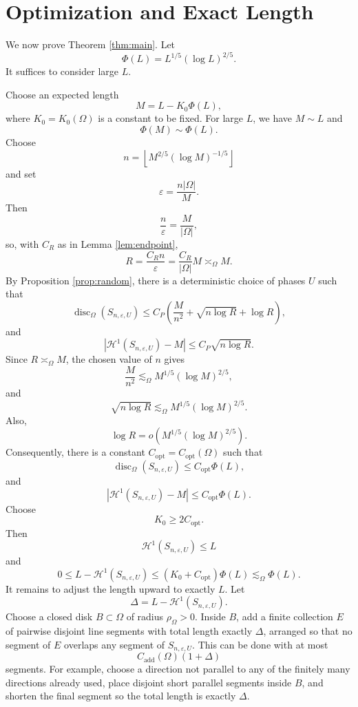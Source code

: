 \documentclass[11pt]{article}
\newcommand{\cH}{\mathcal H}
\newcommand{\eps}{\varepsilon}
\begin{document}
\section{Optimization and Exact Length}

We now prove Theorem \ref{thm:main}. Let
\[
        \Phi(L)=L^{1/5}(\log L)^{2/5}.
\]
It suffices to consider large $L$.

\bigskip
\noindent
Choose an expected length
\[
        M=L-K_0 \Phi(L),
\]
where $K_0=K_0(\Omega)$ is a constant to be fixed. For large $L$, we have $M\sim L$ and
\[
        \Phi(M)\sim \Phi(L).
\]
Choose
\[
        n=
        \left\lfloor
        M^{2/5}(\log M)^{-1/5}
        \right\rfloor
\]
and set
\[
        \eps=\frac{n|\Omega|}{M}.
\]
Then
\[
        \frac{n}{\eps}=\frac{M}{|\Omega|},
\]
so, with $C_R$ as in Lemma \ref{lem:endpoint},
\[
        R=\frac{C_R n}{\eps}
        =
        \frac{C_R}{|\Omega|}M
        \asymp_\Omega M.
\]
By Proposition \ref{prop:random}, there is a deterministic choice of phases $U$ such that
\[
        \operatorname{disc}_\Omega(S_{n,\eps,U})
        \le
        C_P
        \left(
        \frac{M}{n^2}
        +
        \sqrt{n\log R}
        +
        \log R
        \right),
\]
and
\[
        \left|
        \cH^1(S_{n,\eps,U})-M
        \right|
        \le
        C_P\sqrt{n\log R}.
\]
Since $R\asymp_\Omega M$, the chosen value of $n$ gives
\[
        \frac{M}{n^2}
        \lesssim_\Omega
        M^{1/5}(\log M)^{2/5},
\]
and
\[
        \sqrt{n\log R}
        \lesssim_\Omega
        M^{1/5}(\log M)^{2/5}.
\]
Also,
\[
        \log R
        =
        o\left(M^{1/5}(\log M)^{2/5}\right).
\]
Consequently, there is a constant $C_{\mathrm{opt}}=C_{\mathrm{opt}}(\Omega)$ such that
\[
        \operatorname{disc}_\Omega(S_{n,\eps,U})
        \le
        C_{\mathrm{opt}}\Phi(L),
\]
and
\[
        \left|
        \cH^1(S_{n,\eps,U})-M
        \right|
        \le
        C_{\mathrm{opt}}\Phi(L).
\]
Choose
\[
        K_0\ge 2C_{\mathrm{opt}}.
\]
Then
\[
        \cH^1(S_{n,\eps,U})\le L
\]
and
\[
        0\le
        L-\cH^1(S_{n,\eps,U})
        \le
        (K_0+C_{\mathrm{opt}})\Phi(L)
        \lesssim_\Omega \Phi(L).
\]
It remains to adjust the length upward to exactly $L$. Let
\[
        \Delta=L-\cH^1(S_{n,\eps,U}).
\]
Choose a closed disk $B\subset\Omega$ of radius $\rho_\Omega>0$. Inside $B$, add a finite collection $E$ of pairwise disjoint line segments with total length exactly $\Delta$, arranged so that no segment of $E$ overlaps any segment of $S_{n,\eps,U}$. This can be done with at most
\[
        C_{\mathrm{add}}(\Omega)(1+\Delta)
\]
segments. For example, choose a direction not parallel to any of the finitely many directions already used, place disjoint short parallel segments inside $B$, and shorten the final segment so the total length is exactly $\Delta$.
\end{document}
